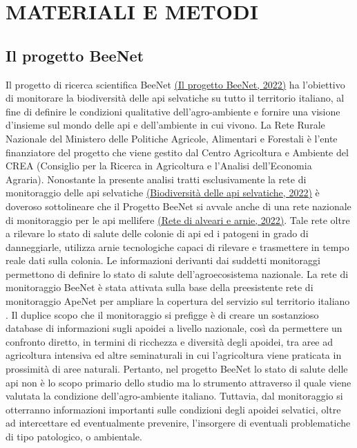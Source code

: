 \documentclass[main.tex]{subfiles}
\begin{document}
\section{MATERIALI E METODI}
\subsection{Il progetto BeeNet}

Il progetto di ricerca scientifica BeeNet \href{https://beenet.crea.gov.it/il-progetto-beenet/}{(Il progetto BeeNet, 2022)} ha l’obiettivo di monitorare la biodiversità delle api selvatiche su tutto il territorio italiano, al fine di definire le condizioni qualitative dell’agro-ambiente e fornire una visione d’insieme sul mondo delle api e dell’ambiente in cui vivono. La Rete Rurale Nazionale del Ministero delle Politiche Agricole, Alimentari e Forestali è l’ente finanziatore del progetto che viene gestito dal Centro Agricoltura e Ambiente del CREA (Consiglio per la Ricerca in Agricoltura e l’Analisi dell'Economia Agraria).
Nonostante la presente analisi tratti esclusivamente la rete di monitoraggio delle api selvatiche \href{https://beenet.crea.gov.it/rete-api-selvatiche/}{(Biodiversit{\`a} delle api selvatiche, 2022)} è doveroso sottolineare che il Progetto BeeNet si avvale anche di una rete nazionale di monitoraggio per le api mellifere \href{https://beenet.crea.gov.it/rete-api-mellifere/}{(Rete di alveari e arnie, 2022)}. Tale rete oltre a rilevare lo stato di salute delle colonie di api ed i patogeni in grado di danneggiarle, utilizza arnie tecnologiche capaci di rilevare e trasmettere in tempo reale dati sulla colonia. Le informazioni derivanti dai suddetti monitoraggi permettono di definire lo stato di salute dell’agroecosistema nazionale.
La rete di monitoraggio BeeNet è stata attivata sulla base della preesistente rete di monitoraggio ApeNet per ampliare la copertura del servizio sul territorio italiano \citep{lode}. Il duplice scopo che il monitoraggio si prefigge è di creare un sostanzioso database di informazioni sugli apoidei a livello nazionale, così da permettere un confronto diretto, in termini di ricchezza e diversità degli apoidei, tra aree ad agricoltura intensiva ed altre seminaturali in cui l'agricoltura viene praticata in prossimità di aree naturali.
Pertanto, nel progetto BeeNet lo stato di salute delle api non è lo scopo primario dello studio ma lo strumento attraverso il quale viene valutata la condizione dell'agro-ambiente italiano. Tuttavia, dal monitoraggio si otterranno informazioni importanti sulle condizioni degli apoidei selvatici, oltre ad intercettare ed eventualmente prevenire, l'insorgere di eventuali problematiche di tipo patologico, o ambientale.
\end{document}
